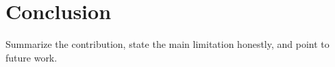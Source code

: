 \section{Conclusion}
Summarize the contribution, state the main limitation honestly, and point to future work.
